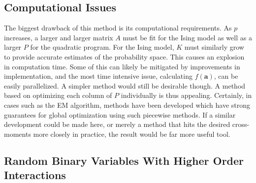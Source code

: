 \documentclass[11pt]{article}
\theoremstyle{definition}
\begin{document}
\subsection{Computational Issues}
    The biggest drawback of this method is its computational requirements. As $p$ increases, a larger and larger matrix $A$ must be fit for the Ising model as well as a larger $P$ for the quadratic program. For the Ising model, $K$ must similarly grow to provide accurate estimates of the probability space. This causes an explosion in computation time. Some of this can likely be mitigated by improvements in implementation, and the most time intensive issue, calculating $f(\mathbf a)$, can be easily parallelized. A simpler method would still be desirable though. A method based on optimizing each column of $P$ individually is thus appealing. Certainly, in cases such as the EM algorithm, methods have been developed which have strong guarantees for global optimization using such piecewise methods. If a similar development could be made here, or merely a method that hits the desired cross-moments more closely in practice, the result would be far more useful tool.

\subsection{Random Binary Variables With Higher Order Interactions}
    
    
    

 

    
\end{document}
